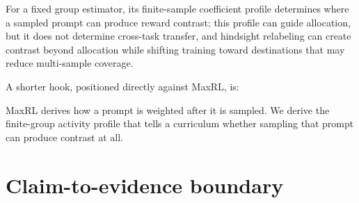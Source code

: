 \documentclass[11pt]{article}
\theoremstyle{definition}
\theoremstyle{remark}
\begin{document}
\begin{rewritebox}[title={\textbf{Recommended one-sentence thesis}}]
For a fixed group estimator, its finite-sample coefficient profile determines where a sampled prompt can produce reward contrast; this profile can guide allocation, but it does not determine cross-task transfer, and hindsight relabeling can create contrast beyond allocation while shifting training toward destinations that may reduce multi-sample coverage.
\end{rewritebox}

A shorter hook, positioned directly against MaxRL, is:

\begin{rewritebox}[title={\textbf{Recommended opening contrast with MaxRL}}]
MaxRL derives how a prompt is weighted after it is sampled. We derive the finite-group activity profile that tells a curriculum whether sampling that prompt can produce contrast at all.
\end{rewritebox}

\section{Claim-to-evidence boundary}
\end{document}
